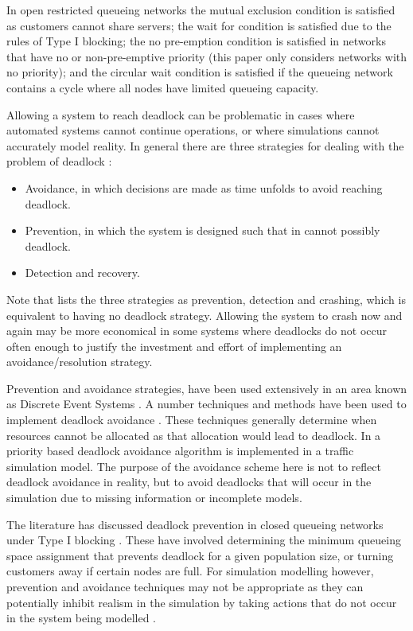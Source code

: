 \documentclass{article}
\numberwithin{equation}{section}
\begin{document}
In open restricted queueing networks the mutual exclusion condition is
satisfied as customers cannot share servers; the wait for condition is
satisfied due to the rules of Type I blocking; the no pre-emption condition is
satisfied in networks that have no or non-pre-emptive priority (this paper only
considers networks with no priority); and the circular wait condition is
satisfied if the queueing network contains a cycle where all nodes have limited
queueing capacity.

Allowing a system to reach deadlock can be problematic in cases where
automated systems cannot continue operations, or where simulations cannot
accurately model reality.
In general there are three strategies for dealing with the problem of deadlock
\cite{kawadkaretal14, elmagarmid86, venkateshsmith05, vis06}:

\begin{itemize}
  \item Avoidance, in which decisions are made as time unfolds to avoid
  reaching deadlock.
  \item Prevention, in which the system is designed such that in cannot
  possibly deadlock.
  \item Detection and recovery.
\end{itemize}

Note that \cite{holt72} lists the three strategies as prevention, detection
and crashing, which is equivalent to having no deadlock strategy.
Allowing the system to crash now and again may be more economical in some
systems where deadlocks do not occur often enough to justify the investment
and effort of implementing an avoidance/resolution strategy.

Prevention and avoidance strategies, have been used extensively in an area known
as Discrete Event Systems \cite{reveliotis15a, reveliotis15b}.
A number techniques and methods have been used to implement deadlock avoidance
\cite{dijkstra82, kawadkaretal14, viswanadhametal90, ezpeletaetal02,
marchettimunierkordon09, belik90, vis06}.
These techniques generally determine when resources cannot be allocated as
that allocation would lead to deadlock.
In \cite{florianetal08} a priority based deadlock avoidance algorithm is
implemented in a traffic simulation model.
The purpose of the avoidance scheme here is not to reflect deadlock avoidance
in reality, but to avoid deadlocks that will occur in the simulation due to
missing information or incomplete models.

The literature has discussed deadlock prevention in closed queueing networks
under Type I blocking \cite{kunduakyildiz89, liebeherrakyildiz95, onvural90,
schmidtjackman00}.
These have involved determining the minimum queueing space assignment that
prevents deadlock for a given population size, or turning customers away if
certain nodes are full.
For simulation modelling however, prevention and avoidance techniques may not
be appropriate as they can potentially inhibit realism in the simulation by
taking actions that do not occur in the system being modelled
\cite{venkateshetal98}.
\end{document}
